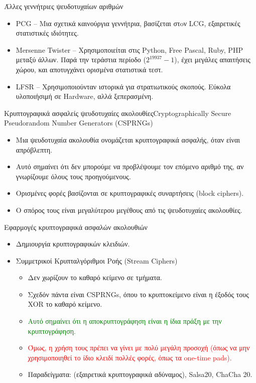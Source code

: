 \documentclass{beamer}
\begin{document}
\begin{frame}{Άλλες γεννήτριες ψευδοτυχαίων αριθμών}
	\begin{itemize}
		\item<2-> PCG -- Μια σχετικά καινούργια γεννήτρια, βασίζεται στoν LCG, εξαιρετικές στατιστικές ιδιότητες.
		\item<3-> Mersenne Twister -- Χρησιμοποιείται στις Python, Free Pascal, Ruby, PHP μεταξύ άλλων. Παρά την τεράστια περίοδο ($2^{19937} - 1$), έχει μεγάλες απαιτήσεις χώρου, και αποτυγχάνει ορισμένα στατιστικά τεστ.
		\item<4-> LFSR -- Χρησιμοποιούνταν ιστορικά για στρατιωτικούς σκοπούς. Εύκολα υλοποιήσιμή σε Hardware, αλλά ξεπερασμένη.
	\end{itemize}
\end{frame}

\begin{frame}{Κρυπτογραφικά ασφαλείς ψευδοτυχαίες ακολουθίες}{Cryptographically Secure Pseudorandom Number Generators (CSPRNGs)}
	\begin{itemize}
		\item<2-> Μια ψευδοτυχαία ακολουθία ονομάζεται \alert{κρυπτογραφικά ασφαλής}, όταν είναι \alert{απρόβλεπτη}.
		\item<3-> Αυτό σημαίνει ότι δεν μπορούμε να προβλέψουμε τον επόμενο αριθμό της, αν γνωρίζουμε όλους τους προηγούμενους.
		\item<4-> Ορισμένες φορές βασίζονται σε κρυπτογραφικές συναρτήσεις (block ciphers).
		\item<5-> Ο σπόρος τους είναι μεγαλύτερου μεγέθους από τις ψευδοτυχαίες ακολουθίες.
	\end{itemize}
\end{frame}

\begin{frame}{Εφαρμογές κρυπτογραφικά ασφαλών ακολουθιών}
    \begin{itemize}
		\item<2-> Δημιουργία κρυπτογραφικών κλειδιών.
		\item<3-> Συμμετρικοί Κρυπταλγόριθμοι Ροής (Stream Ciphers)
		\begin{itemize}
			\item<4-> Δεν χωρίζουν το καθαρό κείμενο σε τμήματα.
			\item<5-> Σχεδόν πάντα είναι CSPRNGs, όπου το κρυπτοκείμενο είναι η έξοδός τους XOR το καθαρό κείμενο.
			\item<6-> \textcolor{green}{Αυτό σημαίνει ότι η αποκρυπτογράφηση είναι η ίδια πράξη με την κρυπτογράφηση.}
			\item<7-> \textcolor{red}{Όμως, η χρήση τους πρέπει να γίνει με πολύ μεγάλη προσοχή (όπως να μην χρησιμοποιηθεί το ίδιο κλειδί πολλές φορές, όπως τα one-time pads).}
			\item<8-> Παραδείγματα:  (εξαιρετικά κρυπτογραφικά αδύναμος), Salsa20, ChaCha 20.
		\end{itemize}
	\end{itemize}
\end{frame}
\end{document}

